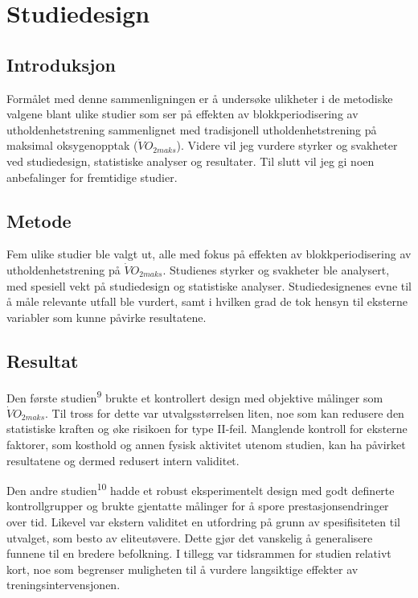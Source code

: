\documentclass[
  letterpaper,
  DIV=11,
  numbers=noendperiod]{scrreprt}
\begin{document}

\chapter{Studiedesign}\label{studiedesign}

\section{Introduksjon}\label{introduksjon-2}

Formålet med denne sammenligningen er å undersøke ulikheter i de
metodiske valgene blant ulike studier som ser på effekten av
blokkperiodisering av utholdenhetstrening sammenlignet med tradisjonell
utholdenhetstrening på maksimal oksygenopptak (\(\dot{V}O_{2maks}\)).
Videre vil jeg vurdere styrker og svakheter ved studiedesign,
statistiske analyser og resultater. Til slutt vil jeg gi noen
anbefalinger for fremtidige studier.

\section{Metode}\label{metode-4}

Fem ulike studier ble valgt ut, alle med fokus på effekten av
blokkperiodisering av utholdenhetstrening på \(\dot{V}O_{2maks}\).
Studienes styrker og svakheter ble analysert, med spesiell vekt på
studiedesign og statistiske analyser. Studiedesignenes evne til å måle
relevante utfall ble vurdert, samt i hvilken grad de tok hensyn til
eksterne variabler som kunne påvirke resultatene.

\section{Resultat}\label{resultat-4}

Den første studien\textsuperscript{9} brukte et kontrollert design med
objektive målinger som \(\dot{V}O_{2maks}\). Til tross for dette var
utvalgsstørrelsen liten, noe som kan redusere den statistiske kraften og
øke risikoen for type II-feil. Manglende kontroll for eksterne faktorer,
som kosthold og annen fysisk aktivitet utenom studien, kan ha påvirket
resultatene og dermed redusert intern validitet.

Den andre studien\textsuperscript{10} hadde et robust eksperimentelt
design med godt definerte kontrollgrupper og brukte gjentatte målinger
for å spore prestasjonsendringer over tid. Likevel var ekstern validitet
en utfordring på grunn av spesifisiteten til utvalget, som besto av
eliteutøvere. Dette gjør det vanskelig å generalisere funnene til en
bredere befolkning. I tillegg var tidsrammen for studien relativt kort,
noe som begrenser muligheten til å vurdere langsiktige effekter av
treningsintervensjonen.
\end{document}
